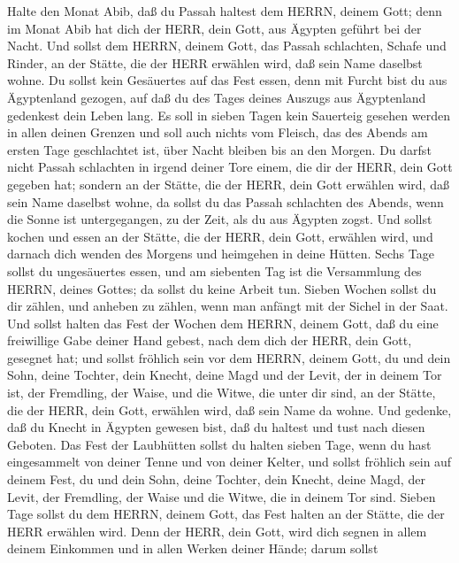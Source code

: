  Halte den Monat Abib, daß du Passah haltest dem HERRN,
deinem Gott; denn im Monat Abib hat dich der HERR, dein Gott, aus
Ägypten geführt bei der Nacht.  Und sollst dem HERRN, deinem
Gott, das Passah schlachten, Schafe und Rinder, an der Stätte, die der
HERR erwählen wird, daß sein Name daselbst wohne.  Du sollst
kein Gesäuertes auf das Fest essen, denn mit Furcht bist du aus
Ägyptenland gezogen, auf daß du des Tages deines Auszugs aus Ägyptenland
gedenkest dein Leben lang.  Es soll in sieben Tagen kein
Sauerteig gesehen werden in allen deinen Grenzen und soll auch nichts
vom Fleisch, das des Abends am ersten Tage geschlachtet ist, über Nacht
bleiben bis an den Morgen.  Du darfst nicht Passah
schlachten in irgend deiner Tore einem, die dir der HERR, dein Gott
gegeben hat;  sondern an der Stätte, die der HERR, dein Gott
erwählen wird, daß sein Name daselbst wohne, da sollst du das Passah
schlachten des Abends, wenn die Sonne ist untergegangen, zu der Zeit,
als du aus Ägypten zogst.  Und sollst kochen und essen an
der Stätte, die der HERR, dein Gott, erwählen wird, und darnach dich
wenden des Morgens und heimgehen in deine Hütten.  Sechs
Tage sollst du ungesäuertes essen, und am siebenten Tag ist die
Versammlung des HERRN, deines Gottes; da sollst du keine Arbeit tun.
 Sieben Wochen sollst du dir zählen, und anheben zu zählen,
wenn man anfängt mit der Sichel in der Saat.  Und sollst
halten das Fest der Wochen dem HERRN, deinem Gott, daß du eine
freiwillige Gabe deiner Hand gebest, nach dem dich der HERR, dein Gott,
gesegnet hat;  und sollst fröhlich sein vor dem HERRN,
deinem Gott, du und dein Sohn, deine Tochter, dein Knecht, deine Magd
und der Levit, der in deinem Tor ist, der Fremdling, der Waise, und die
Witwe, die unter dir sind, an der Stätte, die der HERR, dein Gott,
erwählen wird, daß sein Name da wohne.  Und gedenke, daß du
Knecht in Ägypten gewesen bist, daß du haltest und tust nach diesen
Geboten.  Das Fest der Laubhütten sollst du halten sieben
Tage, wenn du hast eingesammelt von deiner Tenne und von deiner Kelter,
 und sollst fröhlich sein auf deinem Fest, du und dein
Sohn, deine Tochter, dein Knecht, deine Magd, der Levit, der Fremdling,
der Waise und die Witwe, die in deinem Tor sind.  Sieben
Tage sollst du dem HERRN, deinem Gott, das Fest halten an der Stätte,
die der HERR erwählen wird. Denn der HERR, dein Gott, wird dich segnen
in allem deinem Einkommen und in allen Werken deiner Hände; darum sollst
